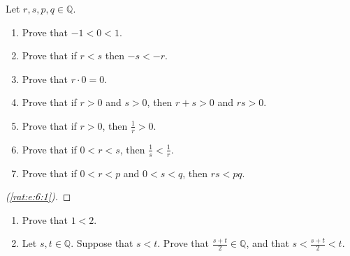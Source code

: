 \Newpage
\begin{exercise} %
	\label{rat:e:6}
	Let ${r, s, p, q \in \mathbb{Q}}$.
	\begin{enumerate}
		\item Prove that $-1 < 0 < 1$. \label{rat:e:6:1}
		\item Prove that if $r < s$ then $-s < -r$. \label{rat:e:6:2}
		\item Prove that $r \cdot 0 = 0$. \label{rat:e:6:3}
		\item Prove that if $r > 0$ and $s > 0$, then $r + s > 0$ and $r s > 0$. \label{rat:e:6:4}
		\item Prove that if $r > 0$, then $\frac{1}{r} > 0$. \label{rat:e:6:5}
		\item Prove that if $0 < r < s$, then $\frac{1}{s} < \frac{1}{r}$. \label{rat:e:6:6}
		\item Prove that if $0 < r < p$ and $0 < s < q$, then $r s < p q$. \label{rat:e:6:7}
	\end{enumerate}
\end{exercise}

\begin{proof}[(\ref{rat:e:6:1})]
	\TODO
\end{proof}







\Newpage
\begin{exercise} %
	\label{rat:e:7}
	\hfill
	\begin{enumerate}
		\item Prove that $1 < 2$. \label{rat:e:7:1}
		\item Let $s, t \in \mathbb{Q}$. Suppose that $s < t$. Prove that $\frac{s + t}{2} \in \mathbb{Q}$, and that $s < \frac{s + t}{2} < t$. \label{rat:e:7:2}
	\end{enumerate}
\end{exercise}

